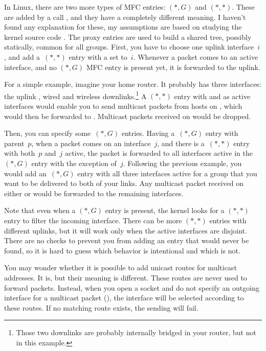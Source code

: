 In Linux, there are two more types of MFC entries: $(*,G)$ and $(*,*)$. These
are added by a call , and they have a completely different
meaning. I haven't found any explanation for these, my assumptions are based on
studying the kernel source code \cite{linux}. The proxy entries are used to build a shared
tree, possibly statically, common for all groups. First, you have to choose one
uplink interface~$i$, and add a~$(*,*)$ entry with a  set
to~$i$. Whenever a packet comes to an active interface, and no $(*, G)$ MFC
entry is present yet, it is forwarded to the uplink.

For a simple example, imagine your home router. It probably has three
interfaces: the uplink , wired  and wireless
 downlinks.\footnote{Those two downlinks are probably internally
bridged in your router, but not in this example.} A $(*,*)$ entry with
 and  as active interfaces would enable you to send
multicast packets from hosts on , which would then be forwarded to
. Multicast packets received on  would be dropped.

Then, you can specify some~$(*,G)$ entries. Having a~$(*,G)$ entry with parent~$p$,
when a packet comes on an interface~$j$, and there is a~$(*,*)$ entry with
both~$p$ and~$j$ active, the packet is forwarded to all interfaces active in
the~$(*,G)$ entry with the exception of~$j$. Following the previous example,
you would add an~$(*,G)$ entry with all three interfaces active for a group
that you want to be delivered to both of your links. Any multicast packet
received on either  or  would be forwarded to the
remaining interfaces.

Note that even when a $(*,G)$ entry is present, the kernel looks for a $(*,*)$
entry to filter the incoming interface. There can be more $(*,*)$ entries with
different uplinks, but it will work only when the active interfaces are
disjoint. There are no checks to prevent you from adding an entry that would
never be found, so it is hard to guess which behavior is intentional and which
is not.

You may wonder whether it is possible to add unicast routes for multicast
addresses. It is, but their meaning is different. These routes are never used
to forward packets. Instead, when you open a socket and do not specify an
outgoing interface for a multicast packet (), the interface
will be selected according to these routes. If no matching route exists, the sending
will fail.
